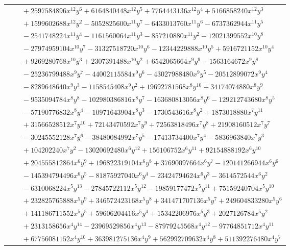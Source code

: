 \documentclass[11pt]{article}
\begin{document}
\begin{longtable}{@{}ll@{}}
 & $\quad +2597584896x^{12}y^{6}+6164840448x^{12}y^{5}+7764443136x^{12}y^{4}+5166858240x^{12}y^{3}$\\
 & $\quad +1599602688x^{12}y^{2}-5052825600x^{11}y^{7}-6433013760x^{11}y^{6}-6737362944x^{11}y^{5}$\\
 & $\quad -2541748224x^{11}y^{4}-1161560064x^{11}y^{3}-857210880x^{11}y^{2}-12021399552x^{10}y^{8}$\\
 & $\quad -27974959104x^{10}y^{7}-31327518720x^{10}y^{6}-12344229888x^{10}y^{5}+5916721152x^{10}y^{4}$\\
 & $\quad +9269280768x^{10}y^{3}+2307391488x^{10}y^{2}+6542065664x^{9}y^{9}-1563164672x^{9}y^{8}$\\
 & $\quad -25236799488x^{9}y^{7}-44002115584x^{9}y^{6}-43027988480x^{9}y^{5}-20512899072x^{9}y^{4}$\\
 & $\quad -8289648640x^{9}y^{3}-1158545408x^{9}y^{2}+19692781568x^{8}y^{10}+34174074880x^{8}y^{9}$\\
 & $\quad -9535094784x^{8}y^{8}-102980386816x^{8}y^{7}-163680813056x^{8}y^{6}-129212743680x^{8}y^{5}$\\
 & $\quad -57190776832x^{8}y^{4}-10971643904x^{8}y^{3}-1730543616x^{8}y^{2}+1873018880x^{7}y^{11}$\\
 & $\quad +31566528512x^{7}y^{10}+72143470592x^{7}y^{9}+72563818496x^{7}y^{8}+21908160512x^{7}y^{7}$\\
 & $\quad -30245552128x^{7}y^{6}-38480084992x^{7}y^{5}-17413734400x^{7}y^{4}-5836963840x^{7}y^{3}$\\
 & $\quad +104202240x^{7}y^{2}-13020692480x^{6}y^{12}+156106752x^{6}y^{11}+92154888192x^{6}y^{10}$\\
 & $\quad +204555812864x^{6}y^{9}+196822319104x^{6}y^{8}+37690097664x^{6}y^{7}-120141266944x^{6}y^{6}$\\
 & $\quad -145394794496x^{6}y^{5}-81875927040x^{6}y^{4}-23424794624x^{6}y^{3}-3614572544x^{6}y^{2}$\\
 & $\quad -6310068224x^{5}y^{13}-27845722112x^{5}y^{12}-19859177472x^{5}y^{11}+75159240704x^{5}y^{10}$\\
 & $\quad +232825765888x^{5}y^{9}+346572423168x^{5}y^{8}+341471707136x^{5}y^{7}+249604833280x^{5}y^{6}$\\
 & $\quad +141186711552x^{5}y^{5}+59606204416x^{5}y^{4}+15342206976x^{5}y^{3}+2027126784x^{5}y^{2}$\\
 & $\quad +2313158656x^{4}y^{14}-23969529856x^{4}y^{13}-87979245568x^{4}y^{12}-97764851712x^{4}y^{11}$\\
 & $\quad +67756081152x^{4}y^{10}+363981275136x^{4}y^{9}+562992709632x^{4}y^{8}+511392276480x^{4}y^{7}$\\

\end{longtable}
\end{document}
